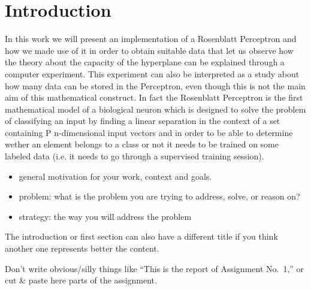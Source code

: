 \section{Introduction}
\label{sec:introduction}

In this work we will present an implementation of a Rosenblatt Perceptron \cite{rosenblatt1958perceptron}
and how we made use of it in order to obtain suitable data that let us observe how the theory about the capacity of the
hyperplane can be explained through a computer experiment. This experiment can also be interpreted as a study about how many
data can be stored in the Perceptron, even though this is not the main aim of this mathematical construct.
In fact the Rosenblatt Perceptron is the first mathematical model of a biological neuron which is designed to
solve the problem of classifying an input by finding a linear separation in the context of a set containing P n-dimensional input vectors
and in order to be able to determine wether an element belongs to a class or not it needs to be trained on some labeled data
(i.e. it needs to go through a supervised training session).





\begin{itemize}
\item general motivation for your work, context and goals.
\item problem: what is the problem you are trying to address, solve, or reason on?
\item strategy: the way you will address the problem
\end{itemize}

The introduction or first section can also have a different title if you think another one represents better the content. 

Don't write obvious/silly things like ``This is the report of Assignment No.\ 1,'' or cut \& paste here parts of the assignment. 
